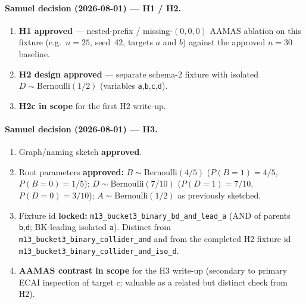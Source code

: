 \documentclass[11pt]{article}
\begin{document}
\paragraph{Samuel decision (2026-08-01) --- H1 / H2.}
\begin{enumerate}
  \item \textbf{H1 approved} --- nested-prefix / missing-\((0,0,0)\) AAMAS
    ablation on this fixture (e.g.\ \(n=25\), seed~42, targets \(a\) and \(b\))
    against the approved \(n=30\) baseline.
  \item \textbf{H2 design approved} --- separate schema-2 fixture with isolated
    \(D\sim\mathrm{Bernoulli}(1/2)\) (variables \texttt{a},\texttt{b},\texttt{c},\texttt{d}).
  \item \textbf{H2c in scope} for the first H2 write-up.
\end{enumerate}

\paragraph{Samuel decision (2026-08-01) --- H3.}
\begin{enumerate}
  \item Graph/naming sketch \textbf{approved}.
  \item Root parameters \textbf{approved:}
    \(B\sim\mathrm{Bernoulli}(4/5)\)
    (\(P(B{=}1)=4/5\), \(P(B{=}0)=1/5\));
    \(D\sim\mathrm{Bernoulli}(7/10)\)
    (\(P(D{=}1)=7/10\), \(P(D{=}0)=3/10\));
    \(A\sim\mathrm{Bernoulli}(1/2)\) as previously sketched.
  \item Fixture id \textbf{locked:} \texttt{m13\_bucket3\_binary\_bd\_and\_lead\_a}
    (AND of parents \texttt{b},\texttt{d}; BK-leading isolated \texttt{a}).
    Distinct from \texttt{m13\_bucket3\_binary\_collider\_and} and from the
    completed H2 fixture id
    \texttt{m13\_bucket3\_binary\_collider\_and\_iso\_d}.
  \item \textbf{AAMAS contrast in scope} for the H3 write-up (secondary to
    primary ECAI inspection of target \(c\); valuable as a related but distinct
    check from H2).
\end{enumerate}
\end{document}
